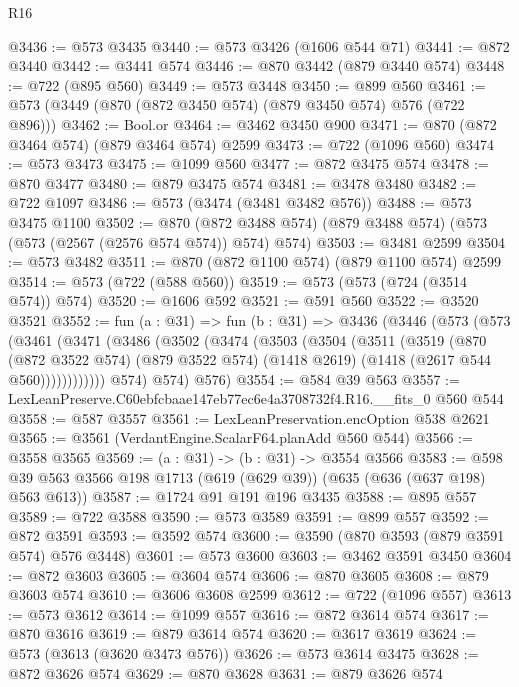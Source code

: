 \begin{lexlean}{R16}
\begin{coremodule}
@3436 := @573 @3435
@3440 := @573 @3426 (@1606 @544 @71)
@3441 := @872 @3440
@3442 := @3441 @574
@3446 := @870 @3442 (@879 @3440 @574)
@3448 := @722 (@895 @560)
@3449 := @573 @3448
@3450 := @899 @560
@3461 := @573 (@3449 (@870 (@872 @3450 @574) (@879 @3450 @574) @576 (@722 @896)))
@3462 := Bool.or
@3464 := @3462 @3450 @900
@3471 := @870 (@872 @3464 @574) (@879 @3464 @574) @2599
@3473 := @722 (@1096 @560)
@3474 := @573 @3473
@3475 := @1099 @560
@3477 := @872 @3475 @574
@3478 := @870 @3477
@3480 := @879 @3475 @574
@3481 := @3478 @3480
@3482 := @722 @1097
@3486 := @573 (@3474 (@3481 @3482 @576))
@3488 := @573 @3475 @1100
@3502 := @870 (@872 @3488 @574) (@879 @3488 @574) (@573 (@573 (@2567 (@2576 @574 @574)) @574) @574)
@3503 := @3481 @2599
@3504 := @573 @3482
@3511 := @870 (@872 @1100 @574) (@879 @1100 @574) @2599
@3514 := @573 (@722 (@588 @560))
@3519 := @573 (@573 (@724 (@3514 @574)) @574)
@3520 := @1606 @592
@3521 := @591 @560
@3522 := @3520 @3521
@3552 := fun (a : @31) =>
  fun (b : @31) =>
  @3436
    (@3446
      (@573
        (@573
          (@3461
            (@3471
              (@3486
                (@3502
                  (@3474
                    (@3503
                      (@3504
                        (@3511
                          (@3519
                            (@870
                              (@872 @3522 @574)
                              (@879 @3522 @574)
                              (@1418 @2619)
                              (@1418 (@2617 @544 @560))))))))))))
          @574)
        @574)
      @576)
@3554 := @584 @39 @563
@3557 := LexLeanPreserve.C60ebfcbaae147eb77ec6e4a3708732f4.R16.__fits_0 @560 @544
@3558 := @587 @3557
@3561 := LexLeanPreservation.encOption @538 @2621
@3565 := @3561 (VerdantEngine.ScalarF64.planAdd @560 @544)
@3566 := @3558 @3565
@3569 := (a : @31) -> (b : @31) -> @3554 @3566
@3583 := @598 @39 @563 @3566 @198 @1713 (@619 (@629 @39)) (@635 (@636 (@637 @198) @563 @613))
@3587 := @1724 @91 @191 @196 @3435
@3588 := @895 @557
@3589 := @722 @3588
@3590 := @573 @3589
@3591 := @899 @557
@3592 := @872 @3591
@3593 := @3592 @574
@3600 := @3590 (@870 @3593 (@879 @3591 @574) @576 @3448)
@3601 := @573 @3600
@3603 := @3462 @3591 @3450
@3604 := @872 @3603
@3605 := @3604 @574
@3606 := @870 @3605
@3608 := @879 @3603 @574
@3610 := @3606 @3608 @2599
@3612 := @722 (@1096 @557)
@3613 := @573 @3612
@3614 := @1099 @557
@3616 := @872 @3614 @574
@3617 := @870 @3616
@3619 := @879 @3614 @574
@3620 := @3617 @3619
@3624 := @573 (@3613 (@3620 @3473 @576))
@3626 := @573 @3614 @3475
@3628 := @872 @3626 @574
@3629 := @870 @3628
@3631 := @879 @3626 @574

\end{coremodule}
\end{lexlean}
